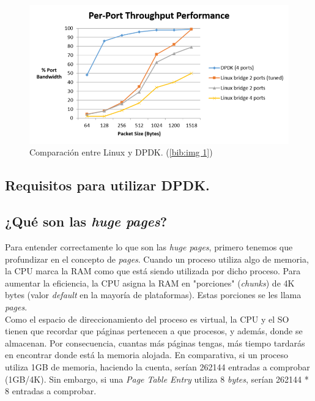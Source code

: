 \documentclass[12pt]{article}
\begin{document}
    \begin{figure}[h]
        \begin{center}
        \includegraphics[width=1\textwidth]{img/TB_per-port-throughput-performance-800x428.png}
        \caption{Comparación entre Linux y DPDK. (\ref{bib:img 1})}
        \end{center}
    \end{figure}
    
    \pagebreak
    
    \subsection{Requisitos para utilizar DPDK.}
    
    
    
    \subsection{¿Qué son las \emph{huge pages}?}
    \noindent Para entender correctamente lo que son las \emph{huge pages}, primero tenemos que profundizar en el concepto de \emph{pages}. Cuando un proceso utiliza algo de memoria, la CPU marca la RAM como que está siendo utilizada por dicho proceso. Para aumentar la eficiencia, la CPU asigna la RAM en "porciones" (\emph{chunks}) de 4K bytes (valor \emph{default} en la mayoría de plataformas). Estas porciones se les llama \emph{pages}.\\
    
    \noindent Como el espacio de direccionamiento del proceso es virtual, la CPU y el SO tienen que recordar que páginas pertenecen a que procesos, y además, donde se almacenan. Por consecuencia, cuantas más páginas tengas, más tiempo tardarás en encontrar donde está la memoria alojada. En comparativa, si un proceso utiliza 1GB de memoria, haciendo la cuenta, serían 262144 entradas a comprobar (1GB/4K). Sin embargo, si una \emph{Page Table Entry} utiliza 8 \emph{bytes}, serían 262144 * 8 entradas a comprobar.\\
    
\end{document}
